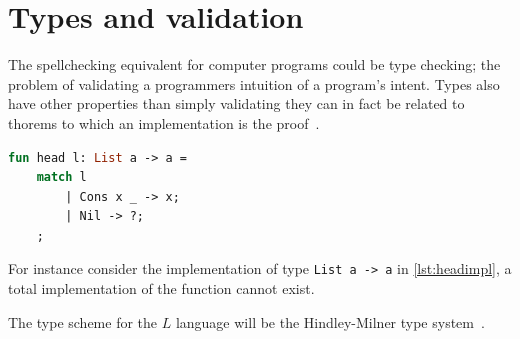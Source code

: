 \documentclass[11pt,oneside,a4paper]{report}
\begin{document}
\section{Types and validation}
The spellchecking equivalent for computer programs could be type checking; the problem of validating a programmers intuition of a program's intent.
Types also have other properties than simply validating they can in fact be related to thorems to which an implementation is the proof~\cite{howard1980formulae}.
\begin{lstlisting}[language=ML,caption={Head implementation},label={lst:headimpl}]
fun head l: List a -> a = 
    match l
        | Cons x _ -> x;
        | Nil -> ?;
    ;
\end{lstlisting}
For instance consider the implementation of type \texttt{List a -> a} in \autoref{lst:headimpl}, a total implementation of the function cannot exist.

The type scheme for the $L$ language will be the Hindley-Milner type system~\cite{hindley1969principal,milner1978theory}.
\end{document}
